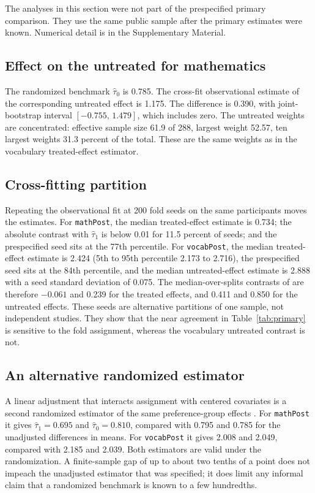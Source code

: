 \documentclass[twoside,11pt]{article}
\begin{document}
The analyses in this section were not part of the prespecified primary comparison. They use the same public sample after the primary estimates were known. Numerical detail is in the Supplementary Material.

\subsection{Effect on the untreated for mathematics}

The randomized benchmark $\widehat\tau_0$ is 0.785. The cross-fit observational estimate of the corresponding untreated effect is 1.175. The difference is 0.390, with joint-bootstrap interval $[-0.755,\,1.479]$, which includes zero. The untreated weights are concentrated: effective sample size 61.9 of 288, largest weight 52.57, ten largest weights 31.3 percent of the total. These are the same weights as in the vocabulary treated-effect estimator.

\subsection{Cross-fitting partition}

Repeating the observational fit at 200 fold seeds on the same participants moves the estimates. For \texttt{mathPost}, the median treated-effect estimate is 0.734; the absolute contrast with $\widehat\tau_1$ is below 0.01 for 11.5 percent of seeds; and the prespecified seed sits at the 77th percentile. For \texttt{vocabPost}, the median treated-effect estimate is 2.424 (5th to 95th percentile 2.173 to 2.716), the prespecified seed sits at the 84th percentile, and the median untreated-effect estimate is 2.888 with a seed standard deviation of 0.075. The median-over-splits contrasts of \citet{chernozhukov2018} are therefore $-0.061$ and 0.239 for the treated effects, and 0.411 and 0.850 for the untreated effects. These seeds are alternative partitions of one sample, not independent studies. They show that the near agreement in Table~\ref{tab:primary} is sensitive to the fold assignment, whereas the vocabulary untreated contrast is not.

\subsection{An alternative randomized estimator}

A linear adjustment that interacts assignment with centered covariates is a second randomized estimator of the same preference-group effects \citep{lin2013}. For \texttt{mathPost} it gives $\widehat\tau_1=0.695$ and $\widehat\tau_0=0.810$, compared with 0.795 and 0.785 for the unadjusted differences in means. For \texttt{vocabPost} it gives 2.008 and 2.049, compared with 2.185 and 2.039. Both estimators are valid under the randomization. A finite-sample gap of up to about two tenths of a point does not impeach the unadjusted estimator that was specified; it does limit any informal claim that a randomized benchmark is known to a few hundredths.
\end{document}
